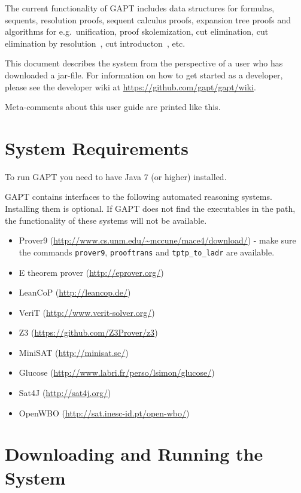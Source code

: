 \documentclass[a4paper,11pt]{article}
\newenvironment{meta}{\color{red}}{\color{black}} %
\begin{document}
The current functionality of GAPT includes data structures for formulas,
sequents, resolution proofs, sequent calculus proofs, expansion tree proofs
and algorithms for e.g.\ unification, proof skolemization, cut elimination,
cut elimination by resolution~\cite{Baaz00CutElimination}, cut introducton~\cite{Hetzl2012}, etc.

This document describes the system from the perspective of a user who has
downloaded a jar-file. For information on how to get started as a developer,
please see the developer wiki at \url{https://github.com/gapt/gapt/wiki}.

\begin{meta}
Meta-comments about this user guide are printed like this.
\end{meta}

\section{System Requirements}
\label{sec:sysreq}

To run GAPT you need to have Java 7 (or higher) installed.

GAPT contains interfaces to the following automated reasoning systems. Installing
them is optional. If GAPT does not find the executables in the path, the
functionality of these systems will not be available. 
%
\begin{itemize}
\item Prover9 (\url{http://www.cs.unm.edu/~mccune/mace4/download/}) - make sure
the commands \texttt{prover9}, \texttt{prooftrans} and \texttt{tptp\_to\_ladr}
are available.
\item E theorem prover (\url{http://eprover.org/})
\item LeanCoP (\url{http://leancop.de/})
\item VeriT (\url{http://www.verit-solver.org/})
\item Z3 (\url{https://github.com/Z3Prover/z3})
\item MiniSAT (\url{http://minisat.se/})
\item Glucose (\url{http://www.labri.fr/perso/lsimon/glucose/})
\item Sat4J (\url{http://sat4j.org/})
\item OpenWBO (\url{http://sat.inesc-id.pt/open-wbo/})
\end{itemize}

\section{Downloading and Running the System}
\end{document}

